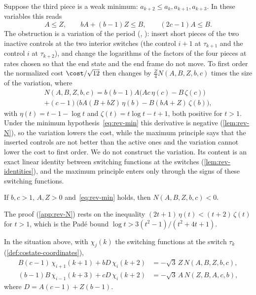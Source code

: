 Suppose the third piece is a weak minimum: $a_{k+2}\le a_k,a_{k+1},a_{k+3}$. In these variables
this reads
\begin{equation}\label{eq:rev-min}
  A\le Z,\qquad bA+(b-1)Z\le B,\qquad (2c-1)A\le B.
\end{equation}
The obstruction is a variation of the period (\cite{Notes},
): insert short pieces of the two
inactive controls at the two interior switches (the control $i+1$ at $\tau_{k+1}$ and the
control $i$ at $\tau_{k+2}$), and change the logarithms of the factors of the four pieces at
rates chosen so that the end state and the end frame do not move. To first order the normalized
cost $\cost/\sqrt{12}$ then changes by $\frac{Z}{4}N(A,B,Z,b,c)$ times the size of the variation, where
\begin{multline}\label{eq:rev-N}
  N(A,B,Z,b,c)=b(b-1)A\bigl(Ac\,\eta(c)-B\,\zeta(c)\bigr)\\
  +(c-1)\bigl(bA(B+bZ)\,\eta(b)-B(bA+Z)\,\zeta(b)\bigr),
\end{multline}
with $\eta(t)=t-1-\log t$ and $\zeta(t)=t\log t-t+1$, both positive for $t>1$. Under the
minimum hypothesis~\eqref{eq:rev-min} this derivative is negative
(\cref{lem:rev-N}), so the variation lowers the cost, while the maximum principle says that the
inserted controls are not better than the active ones and the variation cannot lower the cost to
first order. We do not construct the variation. Its content is an exact linear identity between
switching functions at the switches (\cref{lem:rev-identities}), and the maximum principle enters
only through the signs of these switching functions.

\begin{lemma}\label{lem:rev-N}
If $b,c>1$, $A,Z>0$ and~\eqref{eq:rev-min} holds, then $N(A,B,Z,b,c)<0$.
\end{lemma}

The proof (\cref{app:rev-N}) rests on the inequality $(2t+1)\,\eta(t)<(t+2)\,\zeta(t)$ for $t>1$,
which is the Pad\'e bound $\log t>3(t^2-1)/(t^2+4t+1)$.

\begin{lemma}\label{lem:rev-identities}
In the situation above, with $\chi_j(k)$ the switching functions at the switch $\tau_k$
(\cref{def:costate-coordinates}),
\begin{align}
  B(c-1)\,\chi_{i+1}(k+1)+bD\,\chi_i(k+2)&=-\sqrt3\,Z\,N(A,B,Z,b,c),\label{eq:rev-third}\\
  (b-1)B\,\chi_{i-1}(k+3)+cD\,\chi_i(k+2)&=-\sqrt3\,A\,N(Z,B,A,c,b),\label{eq:rev-second}
\end{align}
where $D=A(c-1)+Z(b-1)$.
\end{lemma}

